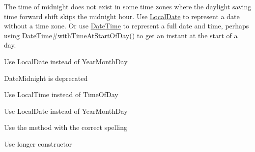 
\begin{DoxyRefList}
\item[\label{deprecated__deprecated000001}%
\hypertarget{deprecated__deprecated000001}{}%
Class \hyperlink{classorg_1_1joda_1_1time_1_1_date_midnight}{org.joda.time.Date\-Midnight} ]The time of midnight does not exist in some time zones where the daylight saving time forward shift skips the midnight hour. Use \hyperlink{}{Local\-Date} to represent a date without a time zone. Or use \hyperlink{}{Date\-Time} to represent a full date and time, perhaps using \hyperlink{}{Date\-Time\#with\-Time\-At\-Start\-Of\-Day()} to get an instant at the start of a day.  
\item[\label{deprecated__deprecated000002}%
\hypertarget{deprecated__deprecated000002}{}%
Member \hyperlink{classorg_1_1joda_1_1time_1_1_date_midnight_a78b0af9757e761162674fa9263c1eb53}{org.joda.time.Date\-Midnight.to\-Year\-Month\-Day} ()]Use Local\-Date instead of Year\-Month\-Day  
\item[\label{deprecated__deprecated000003}%
\hypertarget{deprecated__deprecated000003}{}%
Member \hyperlink{classorg_1_1joda_1_1time_1_1_date_time_aa86546fdfc0384adc4ee0fd02fb0d235}{org.joda.time.Date\-Time.to\-Date\-Midnight} ()]Date\-Midnight is deprecated  
\item[\label{deprecated__deprecated000005}%
\hypertarget{deprecated__deprecated000005}{}%
Member \hyperlink{classorg_1_1joda_1_1time_1_1_date_time_abbf9279cb907ae0ca385583c3d98afee}{org.joda.time.Date\-Time.to\-Time\-Of\-Day} ()]Use Local\-Time instead of Time\-Of\-Day  
\item[\label{deprecated__deprecated000004}%
\hypertarget{deprecated__deprecated000004}{}%
Member \hyperlink{classorg_1_1joda_1_1time_1_1_date_time_a6248810e7ed19e93cb660a37d9f01890}{org.joda.time.Date\-Time.to\-Year\-Month\-Day} ()]Use Local\-Date instead of Year\-Month\-Day  
\item[\label{deprecated__deprecated000006}%
\hypertarget{deprecated__deprecated000006}{}%
Member \hyperlink{classorg_1_1joda_1_1time_1_1format_1_1_date_time_formatter_aa5fa0eeee98a5397d042a07076f6c2f6}{org.joda.time.format.Date\-Time\-Formatter.get\-Chronolgy} ()]Use the method with the correct spelling  
\item[\label{deprecated__deprecated000008}%
\hypertarget{deprecated__deprecated000008}{}%
Member \hyperlink{classorg_1_1joda_1_1time_1_1format_1_1_date_time_parser_bucket_a28b15b964ac538cb87825dcdfe04c131}{org.joda.time.format.Date\-Time\-Parser\-Bucket.Date\-Time\-Parser\-Bucket} (long instant\-Local, Chronology chrono, Locale locale, Integer pivot\-Year)]Use longer constructor  

\end{DoxyRefList}
